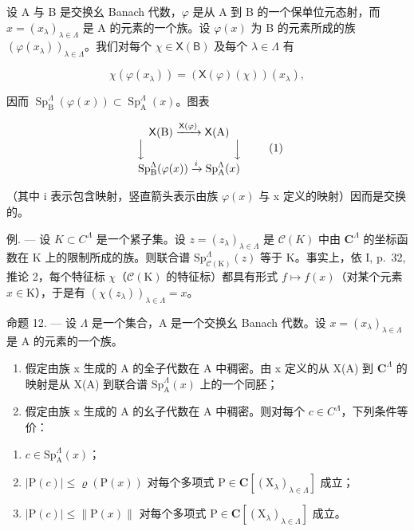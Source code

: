 设 A 与 B 是交换幺 Banach 代数，\(\varphi\) 是从 A 到 B 的一个保单位元态射，而 \(x = (x_{\lambda})_{\lambda \in \Lambda}\) 是 A 的元素的一个族。设 \(\varphi(x)\) 为 B 的元素所成的族 \((\varphi(x_{\lambda}))_{\lambda \in \Lambda}\)。我们对每个 \(\chi \in \mathsf{X}(\mathsf{B})\) 及每个 \(\lambda \in \Lambda\) 有

\[
\chi (\varphi (x _ {\lambda})) = (\mathsf {X} (\varphi) (\chi)) (x _ {\lambda}),
\]

因而 \(\operatorname{Sp}_{\mathrm{B}}^{\Lambda}(\varphi(x)) \subset \operatorname{Sp}_{\mathrm{A}}^{\Lambda}(x)\)。图表

\[
\begin{array}{c} \mathsf {X} (\mathrm{B}) \xrightarrow {\mathsf {X} (\varphi)} \mathsf {X} (\mathrm{A}) \\ \Big \downarrow \qquad \qquad \qquad \qquad \Big \downarrow \\ \operatorname{Sp} _ {\mathrm{B}} ^ {\Lambda} (\varphi (x)) \xrightarrow {i} \operatorname{Sp} _ {\mathrm{A}} ^ {\Lambda} (x) \end{array}\tag{1}
\]

（其中 i 表示包含映射，竖直箭头表示由族 \(\varphi(x)\) 与 x 定义的映射）因而是交换的。

例. --- 设 \(K \subset C^{\Lambda}\) 是一个紧子集。设 \(z = (z_{\lambda})_{\lambda \in \Lambda}\) 是 \(\mathcal{C}(K)\) 中由 \(\mathbf{C}^{\Lambda}\) 的坐标函数在 K 上的限制所成的族。则联合谱 \(\mathrm{Sp}_{\mathcal{C}(\mathrm{K})}^{\Lambda}(z)\) 等于 K。事实上，依 I, p.~32, 推论 2，每个特征标 \(\chi\)（\(\mathcal{C}(\mathrm{K})\) 的特征标）都具有形式 \(f \mapsto f(x)\)（对某个元素 \(x \in \mathrm{K}\)），于是有 \((\chi(z_{\lambda}))_{\lambda \in \Lambda} = x\)。

命题 12. — 设 \(\Lambda\) 是一个集合，A 是一个交换幺 Banach 代数。设 \(x = (x_{\lambda})_{\lambda \in \Lambda}\) 是 A 的元素的一个族。

\begin{enumerate}
\def\labelenumi{\alph{enumi})}
\item
  假定由族 x 生成的 A 的全子代数在 A 中稠密。由 x 定义的从 X(A) 到 \(\mathbf{C}^{\Lambda}\) 的映射是从 X(A) 到联合谱 \(\mathrm{Sp}_{\mathrm{A}}^{\Lambda}(x)\) 上的一个同胚；
\item
  假定由族 x 生成的 A 的幺子代数在 A 中稠密。则对每个 \(c \in C^{\Lambda}\)，下列条件等价：
\end{enumerate}

\begin{enumerate}
\def\labelenumi{(\roman{enumi})}
\item
  \(c \in \mathrm{Sp}_{\mathrm{A}}^{\Lambda}(x)\)；
\item
  \(|\mathrm{P}(c)| \leqslant \varrho(\mathrm{P}(x))\) 对每个多项式 \(\mathrm{P} \in \mathbf{C}[(\mathrm{X}_{\lambda})_{\lambda \in \Lambda}]\) 成立；
\item
  \(|\mathrm{P}(c)| \leqslant \| \mathrm{P}(x)\|\) 对每个多项式 \(\mathrm{P} \in \mathbf{C}[(\mathrm{X}_{\lambda})_{\lambda \in \Lambda}]\) 成立。
\end{enumerate}

